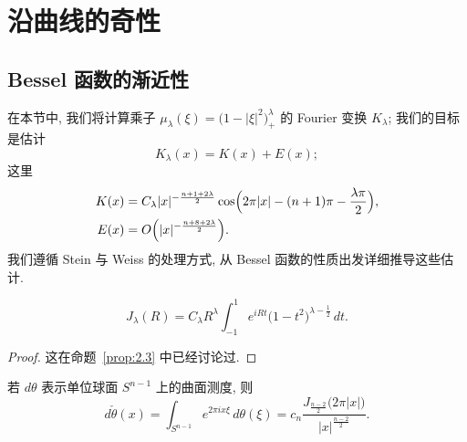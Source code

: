 \chapter{沿曲线的奇性}
\label{chap:5}

\setcounter{mtthm}{-1}

\section{Bessel 函数的渐近性}
\label{sec:5.1}

在本节中, 我们将计算乘子 $\mu_{\lambda}(\xi)=\bigl(1-|\xi|^2\bigr)_+^{\lambda}$ 的 Fourier 变换 $K_{\lambda}$; 我们的目标是估计
\[
K_{\lambda}(x)=K(x)+E(x);
\]
这里
\begin{align*}
K(x)&=C_{\lambda}|x|^{-\frac{n+1+2\lambda}{2}}\cos\Bigl(2\pi|x|-(n+1)\pi-\frac{\lambda\pi}{2}\Bigr), \\
E(x)&=O\Bigl(|x|^{-\frac{n+8+2\lambda}{2}}\Bigr).
\end{align*}
我们遵循 Stein 与 Weiss 的处理方式, 从 Bessel 函数的性质出发详细推导这些估计.

\begin{fact}\label{fact:5.0}
\[
J_{\lambda}(R)=C_{\lambda}R^{\lambda}\int_{-1}^{1}e^{iRt}\bigl(1-t^{2}\bigr)^{\lambda-\frac{1}{2}}\,dt.
\]
\end{fact}

\begin{proof}
这在命题~\ref{prop:2.3} 中已经讨论过.
\end{proof}

\begin{lemma}\label{lem:5.1}
若 $d\theta$ 表示单位球面 $S^{n-1}$ 上的曲面测度, 则
\[
d\check{\theta}(x)=\int_{S^{n-1}}e^{2\pi ix\xi}\,d\theta(\xi)
=c_{n}\frac{J_{\frac{n-2}{2}}\bigl(2\pi|x|\bigr)}{|x|^{\frac{n-2}{2}}}.
\]
\end{lemma}


